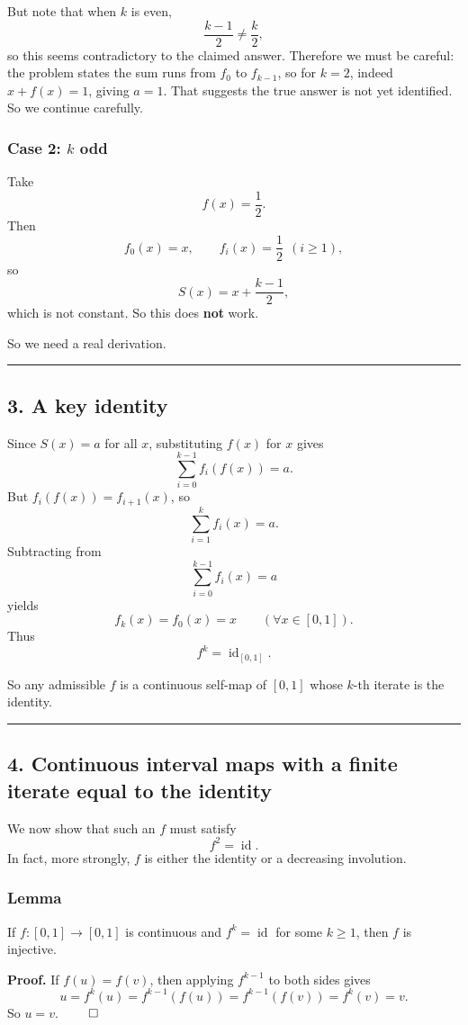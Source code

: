 \documentclass[12pt,a4paper]{article}
\begin{document}
But note that when \(k\) is even,
\[
\frac{k-1}{2}\neq \frac{k}{2},
\]
so this seems contradictory to the claimed answer. Therefore we must be careful: the problem states the sum runs from \(f_0\) to \(f_{k-1}\), so for \(k=2\), indeed \(x+f(x)=1\), giving \(a=1\). That suggests the true answer is not yet identified. So we continue carefully.

\subsubsection*{Case 2: \(k\) odd}
Take
\[
f(x)=\frac12.
\]
Then
\[
f_0(x)=x,\qquad f_i(x)=\frac12 \ \ (i\ge1),
\]
so
\[
S(x)=x+\frac{k-1}{2},
\]
which is not constant. So this does \textbf{not} work.

So we need a real derivation.


\medskip\hrule\medskip


\subsection*{3. A key identity}

Since \(S(x)=a\) for all \(x\), substituting \(f(x)\) for \(x\) gives
\[
\sum_{i=0}^{k-1} f_i(f(x))=a.
\]
But \(f_i(f(x))=f_{i+1}(x)\), so
\[
\sum_{i=1}^{k} f_i(x)=a.
\]
Subtracting from
\[
\sum_{i=0}^{k-1} f_i(x)=a
\]
yields
\[
f_k(x)=f_0(x)=x \qquad (\forall x\in[0,1]).
\]
Thus
\[
f^k=\operatorname{id}_{[0,1]}.
\]

So any admissible \(f\) is a continuous self-map of \([0,1]\) whose \(k\)-th iterate is the identity.


\medskip\hrule\medskip


\subsection*{4. Continuous interval maps with a finite iterate equal to the identity}

We now show that such an \(f\) must satisfy
\[
f^2=\operatorname{id}.
\]
In fact, more strongly, \(f\) is either the identity or a decreasing involution.

\subsubsection*{Lemma}
If \(f:[0,1]\to[0,1]\) is continuous and \(f^k=\operatorname{id}\) for some \(k\ge1\), then \(f\) is injective.

\textbf{Proof.}
If \(f(u)=f(v)\), then applying \(f^{k-1}\) to both sides gives
\[
u=f^k(u)=f^{k-1}(f(u))=f^{k-1}(f(v))=f^k(v)=v.
\]
So \(u=v\). $\qed$
\end{document}
